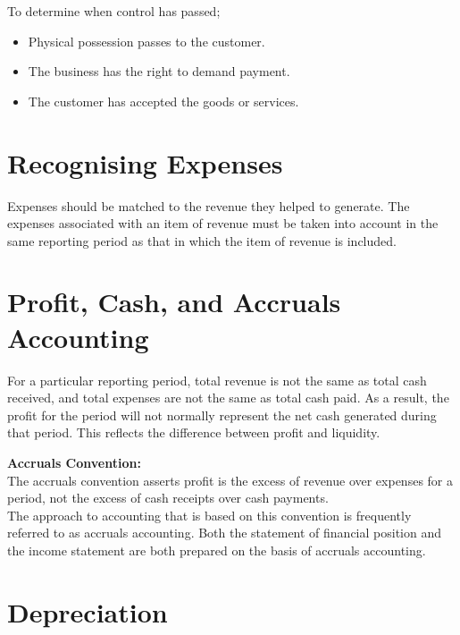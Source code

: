 \documentclass{report}
\newenvironment{blackbox}[1][Black]
  {\begin{tcolorbox}[colframe=#1,colback=white]}
  {\end{tcolorbox}}
\begin{document}
To determine when control has passed;
\begin{itemize}
    \item Physical possession passes to the customer.
    \item The business has the right to demand payment.
    \item The customer has accepted the goods or services.\\
\end{itemize}

\section{Recognising Expenses}

Expenses should be matched to the revenue they helped to generate. The expenses associated with an item of revenue must be taken into account in the same reporting period as that in which the item of revenue is included.

\section{Profit, Cash, and Accruals Accounting}

For a particular reporting period, total revenue is not the same as total cash received, and total expenses are not the same as total cash paid. As a result, the profit for the period will not normally represent the net cash generated during that period. This reflects the difference between profit and liquidity.

\begin{blackbox}
    \textbf{Accruals Convention:}\\
    The accruals convention asserts profit is the excess of revenue over expenses for a period, not the excess of cash receipts over cash payments.\\
    The approach to accounting that is based on this convention is frequently referred to as accruals accounting. Both the statement of financial position and the income statement are both prepared on the basis of accruals accounting.
\end{blackbox}

\section{Depreciation}
\end{document}
